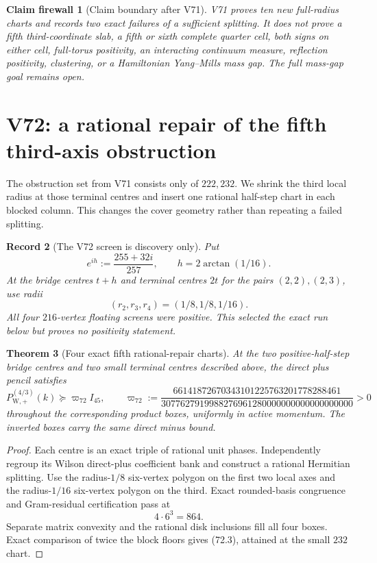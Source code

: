 \documentclass[11pt,oneside]{article}
\newtheorem{theorem}{Theorem}[section]
\newtheorem{firewall}[theorem]{Claim firewall}
\newtheorem{record}[theorem]{Record}
\theoremstyle{definition}
\theoremstyle{remark}
\begin{document}
\begin{firewall}[Claim boundary after V71]
\label{fire:newv71-final}
V71 proves ten new full-radius charts and records two exact failures
of a sufficient splitting.  It does not prove a fifth
third-coordinate slab, a fifth or sixth complete quarter cell, both
signs on either cell, full-torus positivity, an interacting
continuum measure, reflection positivity, clustering, or a
Hamiltonian Yang--Mills mass gap.  The full mass-gap goal remains
open.
\end{firewall}

\section{V72: a rational repair of the fifth third-axis obstruction}
\label{sec:newv72-fifth-bridge}

The obstruction set from V71 consists only of \(222,232\).  We
shrink the third local radius at those terminal centres and insert
one rational half-step chart in each blocked column.  This changes
the cover geometry rather than repeating a failed splitting.

\begin{record}[The V72 screen is discovery only]
\label{rec:newv72-screen}
Put
\[
 e^{ih}:=\frac{255+32i}{257},\qquad h=2\arctan(1/16). \tag{72.1}
\]
At the bridge centres \(t+h\) and terminal centres \(2t\) for the
pairs \((2,2),(2,3)\), use radii
\[
 (r_2,r_3,r_4)=(1/8,1/8,1/16).                       \tag{72.2}
\]
All four \(216\)-vertex floating screens were positive.  This
selected the exact run below but proves no positivity statement.
\end{record}

\begin{theorem}[Four exact fifth rational-repair charts]
\label{thm:newv72-four-charts}
At the two positive-half-step bridge centres and two small terminal
centres described above, the direct plus pencil satisfies
\[
 P_{\mathrm W,+}^{(4/3)}(k)
 \succeq\varpi_{72}I_{45},\qquad
 \varpi_{72}:=
 \frac{66141872670343101225763201778288461}
 {3077627919988276961280000000000000000000}>0         \tag{72.3}
\]
throughout the corresponding product boxes, uniformly in active
momentum.  The inverted boxes carry the same direct minus bound.
\end{theorem}

\begin{proof}
Each centre is an exact triple of rational unit phases.  Independently
regroup its Wilson direct-plus coefficient bank and construct a
rational Hermitian splitting.  Use the radius-\(1/8\) six-vertex
polygon on the first two local axes and the radius-\(1/16\)
six-vertex polygon on the third.  Exact rounded-basis congruence and
Gram-residual certification pass at
\[
 4\cdot6^3=864.                                       \tag{72.4}
\]
Separate matrix convexity and the rational disk inclusions fill all
four boxes.  Exact comparison of twice the block floors gives
(72.3), attained at the small \(232\) chart.
\end{proof}
\end{document}

